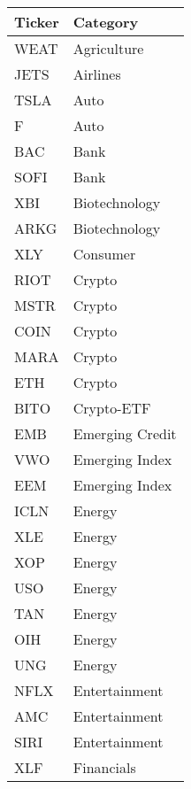 
\begin{table}[H]
    \centering
    \small
    \begin{tabular}{ll}
        \toprule
        Ticker & Category \\   
        \midrule
        WEAT & Agriculture \\
        \hline
        JETS & Airlines \\
        \hline
        TSLA & Auto \\
        \hline
        F & Auto \\
        \hline
        BAC & Bank \\
        \hline
        SOFI & Bank \\
        \hline
        XBI & Biotechnology \\
        \hline
        ARKG & Biotechnology \\
        \hline
        XLY & Consumer \\
        \hline
        RIOT & Crypto \\
        \hline
        MSTR & Crypto \\
        \hline
        COIN & Crypto \\
        \hline
        MARA & Crypto \\
        \hline
        ETH & Crypto \\
        \hline
        BITO & Crypto-ETF \\
        \hline
        EMB & Emerging Credit \\
        \hline
        VWO & Emerging Index \\
        \hline
        EEM & Emerging Index \\
        \hline
        ICLN & Energy \\
        \hline
        XLE & Energy \\
        \hline
        XOP & Energy \\
        \hline
        USO & Energy \\
        \hline
        TAN & Energy \\
        \hline
        OIH & Energy \\
        \hline
        UNG & Energy \\
        \hline
        NFLX & Entertainment \\
        \hline
        AMC & Entertainment \\
        \hline
        SIRI & Entertainment \\
        \hline
        XLF & Financials \\

\end{tabular}
\end{table}
